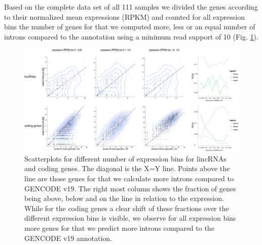\documentclass[ncrna,article,submit,moreauthors,pdftex,10pt,a4paper]{mdpi}
\begin{document}
Based on the complete data set of all 111 samples we divided the genes according to their normalized mean expressions (RPKM) and counted for all expression bins the number of genes for that we computed more, less or an equal number of introns compared to the annotation using a minimum read support of 10 (Fig. \ref{scatter}). 

\begin{figure}[h]
 \centering
 \includegraphics[height = 10 cm, width=\linewidth]{Fig1.pdf}
 \caption{Scatterplots for different number of expression bins for lincRNAs and coding genes. 
The diagonal is the X=Y line. Points above the line are those genes for that we calculate more introns compared to GENCODE v19.
The right most column shows the fraction of genes being above, below and on the line  in relation to the expression.
While for the coding genes a clear shift of these fractions over the different expression bins is visible, we observe for all expression bins more genes for that we predict more introns compared to the GENCODE v19 annotation.}
 \label{scatter}
\end{figure}
\end{document}
